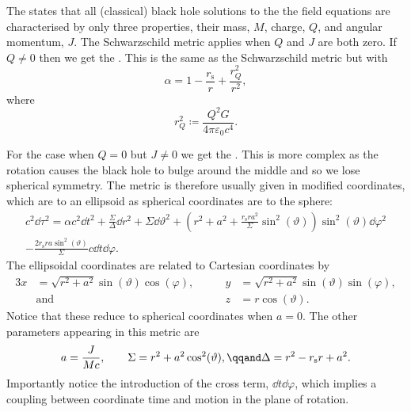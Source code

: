 \documentclass[fleqn]{NotesClass}
\begin{document}
    The  states that all (classical) black hole solutions to the the field equations are characterised by only three properties, their mass, \(M\), charge, \(Q\), and angular momentum, \(J\).
    The Schwarzschild metric applies when \(Q\) and \(J\) are both zero.
    If \(Q \ne 0\) then we get the .
    This is the same as the Schwarzschild metric but with
    \begin{equation}
        \alpha = 1 - \frac{r_{\mathrm{s}}}{r} + \frac{r_Q^2}{r^2},
    \end{equation}
    where
    \begin{equation}
        r_Q^2 \coloneqq \frac{Q^2G}{4\pi\varepsilon_0c^4}.
    \end{equation}

    For the case when \(Q = 0\) but \(J \ne 0\) we get the .
    This is more complex as the rotation causes the black hole to bulge around the middle and so we lose spherical symmetry.
    The metric is therefore usually given in modified coordinates, which are to an ellipsoid as spherical coordinates are to the sphere:
    \begin{multline}
        c^2\dd{\tau}^2 = \alpha c^2\dd{t}^2 + \frac{\Sigma}{\Delta}\dd{r}^2 + \Sigma\dd{\vartheta}^2 + \left( r^2 + a^2 + \frac{r_{\mathrm{s}}ra^2}{\Sigma}\sin^2(\vartheta) \right)\sin^2(\vartheta)\dd{\varphi}^2\\
        - \frac{2r_{\mathrm{s}}ra\sin^2(\vartheta)}{\Sigma} c\dd{t}\dd{\varphi}.
    \end{multline}
    The ellipsoidal coordinates are related to Cartesian coordinates by
    \begin{alignat}{3}
        x &= \sqrt{r^2 + a^2}\sin(\vartheta)\cos(\varphi), \qquad & y &= \sqrt{r^2 + a^2}\sin(\vartheta)\sin(\varphi),\\
        &\text{and} &  z &= r\cos(\vartheta).
    \end{alignat}
    Notice that these reduce to spherical coordinates when \(a = 0\).
    The other parameters appearing in this metric are
    \begin{equation}
        a = \frac{J}{Mc}, \qquad \Sigma = r^2 + a^2\cos^2(\vartheta), \qqand \Delta = r^2 - r_{\mathrm{s}}r + a^2.
    \end{equation}
    Importantly notice the introduction of the cross term, \(\dd{t}\dd{\varphi}\), which implies a coupling between coordinate time and motion in the plane of rotation.
    
\end{document}

